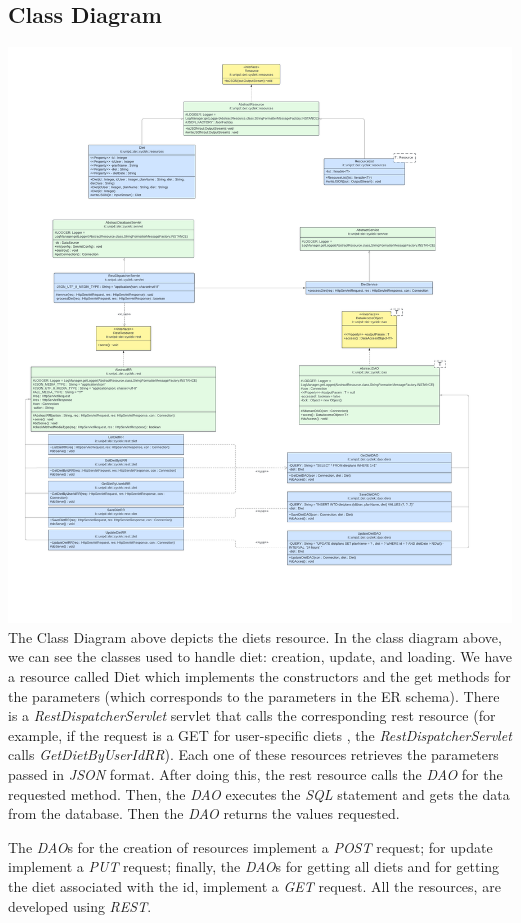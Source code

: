 \subsection{Class Diagram}

\includegraphics[scale=0.32]{Resources/DietUML.pdf}\newpage
The Class Diagram above depicts the diets resource. 
In the class diagram above, we can see the classes used to handle diet: creation, update, and loading. We have a resource called Diet which implements the constructors and the get methods for the parameters (which corresponds to the parameters in the ER schema). 
There is a \textit{RestDispatcherServlet} servlet that calls the corresponding rest resource (for example, if the request is a GET for user-specific diets , the \textit{RestDispatcherServlet} calls \textit{GetDietByUserIdRR}). Each one of these resources retrieves the parameters passed in \textit{JSON} format. After doing this, the rest resource calls the \textit{DAO} for the requested method. Then, the \textit{DAO} executes the \textit{SQL} statement and gets the data from the database. Then the \textit{DAO} returns the values requested.

The \textit{DAO}s for the creation of resources implement a \textit{POST} request;  for update implement a \textit{PUT} request; finally, the \textit{DAO}s for getting all diets and for getting the diet associated with the id, implement a \textit{GET} request.
\vspace{0.5 cm}
All the resources, are developed using \textit{REST}.

